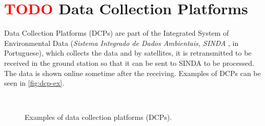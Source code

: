 \section{ \textcolor{red}{TODO} Data Collection Platforms}

Data Collection Platforms (DCPs) are part of the Integrated System of Environmental Data (\textit{Sistema Integrado de Dados Ambientais, SINDA} \cite{sinda}, in Portuguese), which collects the data and by satellites, it is retransmitted to be received in the ground station so that it can be sent to SINDA to be processed. The data is shown online sometime after the receiving. Examples of DCPs can be seen in \autoref{fig:dcp-ex}.

\begin{figure}[!htb]
    \begin{center}
        ~

        \caption{Examples of data collection platforms (DCPs).}
        \label{fig:dcp-ex}
    \end{center}
\end{figure}
